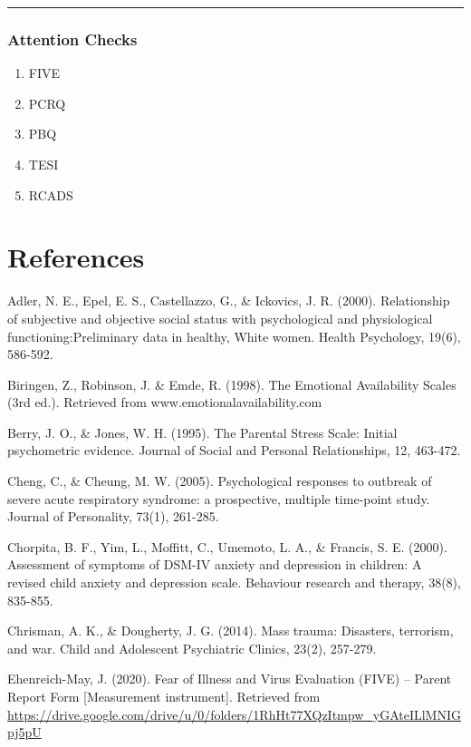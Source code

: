 \documentclass[]{book}
\providecommand{\tightlist}{%
  \setlength{\itemsep}{0pt}\setlength{\parskip}{0pt}}
\begin{document}
\begin{center}\rule{0.5\linewidth}{0.5pt}\end{center}

\hypertarget{attention-checks}{%
\subsection{Attention Checks}\label{attention-checks}}

\begin{enumerate}
\def\labelenumi{\arabic{enumi}.}
\tightlist
\item
  FIVE
\item
  PCRQ
\item
  PBQ
\item
  TESI
\item
  RCADS
\end{enumerate}

\hypertarget{references}{%
\chapter{References}\label{references}}

Adler, N. E., Epel, E. S., Castellazzo, G., \& Ickovics, J. R. (2000).
Relationship of subjective and objective social status with psychological
and physiological functioning:Preliminary data in healthy, White women.
Health Psychology, 19(6), 586-592.

Biringen, Z., Robinson, J. \& Emde, R. (1998). The Emotional Availability
Scales (3rd ed.). Retrieved from www.emotionalavailability.com

Berry, J. O., \& Jones, W. H. (1995). The Parental Stress Scale: Initial
psychometric evidence. Journal of Social and Personal Relationships, 12,
463-472.

Cheng, C., \& Cheung, M. W. (2005). Psychological responses to outbreak of
severe acute respiratory syndrome: a prospective, multiple time‐point
study. Journal of Personality, 73(1), 261-285.

Chorpita, B. F., Yim, L., Moffitt, C., Umemoto, L. A., \& Francis, S. E. (2000). Assessment of
symptoms of DSM-IV anxiety and depression in children: A revised child anxiety and
depression scale. Behaviour research and therapy, 38(8), 835-855.

Chrisman, A. K., \& Dougherty, J. G. (2014). Mass trauma: Disasters, terrorism, and war. Child
and Adolescent Psychiatric Clinics, 23(2), 257-279.

Ehenreich-May, J. (2020). Fear of Illness and Virus Evaluation (FIVE) -- Parent Report Form
{[}Measurement instrument{]}. Retrieved from
\url{https://drive.google.com/drive/u/0/folders/1RhHt77XQzItmpw_yGAteILlMNIGpj5pU}
\end{document}
